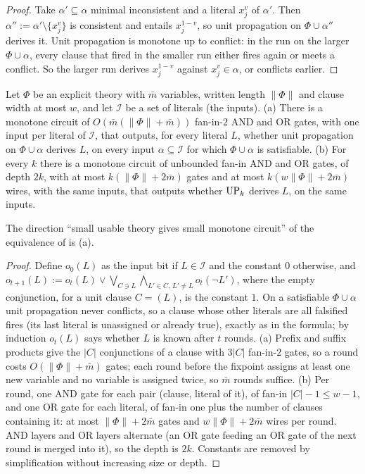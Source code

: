\begin{proof}
Take $\alpha'\subseteq\alpha$ minimal inconsistent and a literal $x_j^v$ of $\alpha'$. Then $\alpha'':=\alpha'\setminus\{x_j^v\}$ is consistent and entails $x_j^{1-v}$, so unit propagation on $\Phi\cup\alpha''$ derives it. Unit propagation is monotone up to conflict: in the run on the larger $\Phi\cup\alpha$, every clause that fired in the smaller run either fires again or meets a conflict. So the larger run derives $x_j^{1-v}$ against $x_j^v\in\alpha$, or conflicts earlier.
\end{proof}

\begin{lemma}\label{lem:shape:upcircuit}
Let $\Phi$ be an explicit theory with $\bar m$ variables, written length $\lVert\Phi\rVert$ and clause width at most $w$, and let $\mathcal I$ be a set of literals (the inputs).
(a) There is a monotone circuit of $O(\bar m(\lVert\Phi\rVert+\bar m))$ fan-in-$2$ AND and OR gates, with one input per literal of $\mathcal I$, that outputs, for every literal $L$, whether unit propagation on $\Phi\cup\alpha$ derives $L$, on every input $\alpha\subseteq\mathcal I$ for which $\Phi\cup\alpha$ is satisfiable.
(b) For every $k$ there is a monotone circuit of unbounded fan-in AND and OR gates, of depth $2k$, with at most $k(\lVert\Phi\rVert+2\bar m)$ gates and at most $k(w\lVert\Phi\rVert+2\bar m)$ wires, with the same inputs, that outputs whether $\mathrm{UP}_k$ derives $L$, on the same inputs.
\end{lemma}

The direction ``small usable theory gives small monotone circuit'' of the equivalence of \citet{bessiere2009circuit} is (a).

\begin{proof}
Define $o_0(L)$ as the input bit if $L\in\mathcal I$ and the constant $0$ otherwise, and $o_{t+1}(L):=o_t(L)\vee\bigvee_{C\ni L}\bigwedge_{L'\in C,\,L'\ne L}o_t(\neg L')$, where the empty conjunction, for a unit clause $C=(L)$, is the constant $1$. On a satisfiable $\Phi\cup\alpha$ unit propagation never conflicts, so a clause whose other literals are all falsified fires (its last literal is unassigned or already true), exactly as in the formula; by induction $o_t(L)$ says whether $L$ is known after $t$ rounds. (a) Prefix and suffix products give the $\lvert C\rvert$ conjunctions of a clause with $3\lvert C\rvert$ fan-in-$2$ gates, so a round costs $O(\lVert\Phi\rVert+\bar m)$ gates; each round before the fixpoint assigns at least one new variable and no variable is assigned twice, so $\bar m$ rounds suffice. (b) Per round, one AND gate for each pair (clause, literal of it), of fan-in $\lvert C\rvert-1\le w-1$, and one OR gate for each literal, of fan-in one plus the number of clauses containing it: at most $\lVert\Phi\rVert+2\bar m$ gates and $w\lVert\Phi\rVert+2\bar m$ wires per round. AND layers and OR layers alternate (an OR gate feeding an OR gate of the next round is merged into it), so the depth is $2k$. Constants are removed by simplification without increasing size or depth.
\end{proof}

